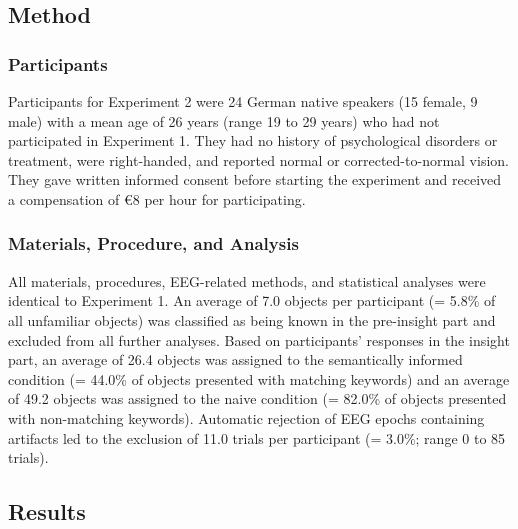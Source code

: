 \documentclass[
  english,
  doc,12pt,twoside,floatsintext]{apa7}
\begin{document}
\hypertarget{method-1}{%
\subsection{Method}\label{method-1}}

\hypertarget{participants-1}{%
\subsubsection{Participants}\label{participants-1}}

Participants for Experiment 2 were 24 German native speakers (15 female, 9 male) with a mean age of 26 years (range 19 to 29 years) who had not participated in Experiment 1. They had no history of psychological disorders or treatment, were right-handed, and reported normal or corrected-to-normal vision. They gave written informed consent before starting the experiment and received a compensation of €8 per hour for participating.

\hypertarget{materials-procedure-and-analysis}{%
\subsubsection{Materials, Procedure, and Analysis}\label{materials-procedure-and-analysis}}

All materials, procedures, EEG-related methods, and statistical analyses were identical to Experiment 1. An average of 7.0 objects per participant (= 5.8\% of all unfamiliar objects) was classified as being known in the pre-insight part and excluded from all further analyses. Based on participants' responses in the insight part, an average of 26.4 objects was assigned to the semantically informed condition (= 44.0\% of objects presented with matching keywords) and an average of 49.2 objects was assigned to the naive condition (= 82.0\% of objects presented with non-matching keywords). Automatic rejection of EEG epochs containing artifacts led to the exclusion of 11.0 trials per participant (= 3.0\%; range 0 to 85 trials).

\hypertarget{results-1}{%
\subsection{Results}\label{results-1}}
\end{document}
